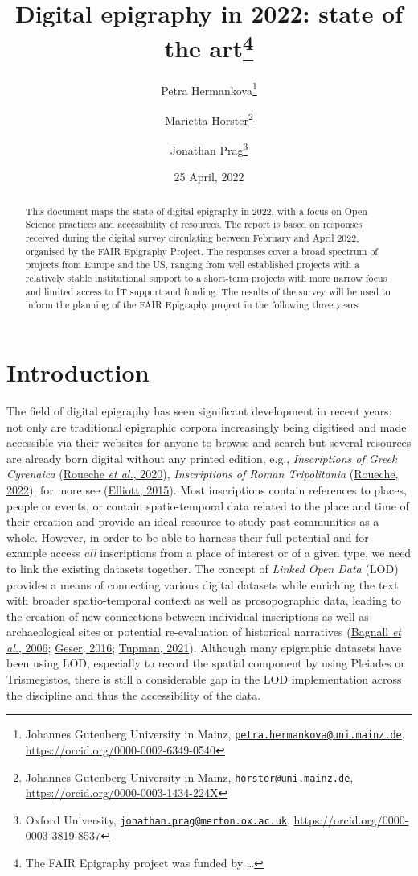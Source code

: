 \documentclass[
  10pt,
]{article}
\title{Digital epigraphy in 2022: state of the art\thanks{The FAIR
Epigraphy project was funded by \ldots{}}}
\author{Petra Hermankova\footnote{Johannes Gutenberg University in
  Mainz,
  \href{mailto:petra.hermankova@uni.mainz.de}{\nolinkurl{petra.hermankova@uni.mainz.de}},
  \url{https://orcid.org/0000-0002-6349-0540}} \and Marietta
Horster\footnote{Johannes Gutenberg University in Mainz,
  \href{mailto:horster@uni.mainz.de}{\nolinkurl{horster@uni.mainz.de}},
  \url{https://orcid.org/0000-0003-1434-224X}} \and Jonathan
Prag\footnote{Oxford University,
  \href{mailto:jonathan.prag@merton.ox.ac.uk}{\nolinkurl{jonathan.prag@merton.ox.ac.uk}},
  \url{https://orcid.org/0000-0003-3819-8537}}}
\date{25 April, 2022}
\begin{document}
\maketitle
\begin{abstract}
This document maps the state of digital epigraphy in 2022, with a focus
on Open Science practices and accessibility of resources. The report is
based on responses received during the digital survey circulating
between February and April 2022, organised by the FAIR Epigraphy
Project. The responses cover a broad spectrum of projects from Europe
and the US, ranging from well established projects with a relatively
stable institutional support to a short-term projects with more narrow
focus and limited access to IT support and funding. The results of the
survey will be used to inform the planning of the FAIR Epigraphy project
in the following three years.
\end{abstract}

\hypertarget{introduction}{%
\section{Introduction}\label{introduction}}

The field of digital epigraphy has seen significant development in
recent years: not only are traditional epigraphic corpora increasingly
being digitised and made accessible via their websites for anyone to
browse and search but several resources are already born digital without
any printed edition, e.g., \emph{Inscriptions of Greek Cyrenaica}
(\protect\hyperlink{ref-roueche_inscriptions_2020}{Roueche \emph{et
al.}, 2020}), \emph{Inscriptions of Roman Tripolitania}
(\protect\hyperlink{ref-roueche_inscriptions_2022}{Roueche, 2022}); for
more see (\protect\hyperlink{ref-bruun_epigraphy_2015}{Elliott, 2015}).
Most inscriptions contain references to places, people or events, or
contain spatio-temporal data related to the place and time of their
creation and provide an ideal resource to study past communities as a
whole. However, in order to be able to harness their full potential and
for example access \emph{all} inscriptions from a place of interest or
of a given type, we need to link the existing datasets together. The
concept of \emph{Linked Open Data} (LOD) provides a means of connecting
various digital datasets while enriching the text with broader
spatio-temporal context as well as prosopographic data, leading to the
creation of new connections between individual inscriptions as well as
archaeological sites or potential re-evaluation of historical narratives
(\protect\hyperlink{ref-bagnall_pleiades_2006}{Bagnall \emph{et al.},
2006}; \protect\hyperlink{ref-geser_wp15_2016}{Geser, 2016};
\protect\hyperlink{ref-tupman_where_2021}{Tupman, 2021}). Although many
epigraphic datasets have been using LOD, especially to record the
spatial component by using Pleiades or Trismegistos, there is still a
considerable gap in the LOD implementation across the discipline and
thus the accessibility of the data.
\end{document}
